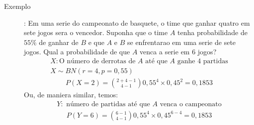 \begin{description}
    \item[Exemplo]: Em uma serie do campeonato de basquete, o time que ganhar quatro em sete jogos sera
      o vencedor. Suponha que o time $A$ tenha probabilidade de $55\%$ de ganhar de $B$ e que $A$ e $B$ 
      se enfrentarao em uma serie de sete jogos. Qual a probabilidade de que $A$ venca a serie em 6 jogos?
     \begin{align*} 
       X:\text{O número de derrotas de $A$ até que $A$ ganhe 4 partidas}\\
       X \mathtt{\sim}BN (r=4, p=0,55)
     \end{align*}
     \begin{align*}
       P(X=2)=\binom{2+4-1}{4-1} 0,55^{4}\times 0,45^{2}=0,1853
     \end{align*}
     Ou, de maniera similar, temos:
     \begin{align*}
       Y: \text{ número de partidas até que $A$ venca o campeonato}
     \end{align*}
     \begin{align*}
       P(Y=6)= \binom{6-1}{4-1} 0,55^{4} \times 0,45^{6-4} = 0,1853
     \end{align*}
 \end{description}
